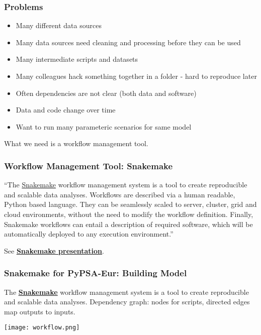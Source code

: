 \documentclass[10pt,aspectratio=169,dvipsnames]{beamer}
\let\olditem\item
\renewcommand{\item}{%
\olditem\vspace{5pt}}
\begin{document}
\begin{frame}
  \frametitle{Problems}

  \begin{itemize}
  \item Many different data sources
  \item Many data sources need cleaning and processing before they can be used
  \item Many intermediate scripts and datasets
  \item Many colleagues hack something together in a folder - hard to reproduce later
  \item Often dependencies are not clear (both data and software)
  \item Data and code change over time
  \item Want to run many parameteric scenarios for same model
  \end{itemize}

  \vspace{.5cm}
  \pause
  What we need is a \alert{workflow management tool}.

\end{frame}

\begin{frame}
  \frametitle{Workflow Management Tool: Snakemake}

  ``The \href{https://snakemake.readthedocs.io/en/stable/}{Snakemake} workflow management system is a tool to create \alert{reproducible and scalable data analyses}. Workflows are described via a human readable, Python based language. They can be seamlessly scaled to server, cluster, grid and cloud environments, without the need to modify the workflow definition. Finally, Snakemake workflows can entail a description of required software, which will be automatically deployed to any execution environment.''

 \vspace{1cm}

  See \href{https://slides.com/johanneskoester/snakemake-short}{\bf\color{blue}\underline{Snakemake presentation}}.

\end{frame}


\begin{frame}
  \frametitle{Snakemake for PyPSA-Eur: Building Model}

    The \href{https://snakemake.readthedocs.io/en/stable/}{\bf\color{blue}\underline{Snakemake}} workflow management system is a tool to create \alert{reproducible and scalable data analyses}. Dependency graph: \alert{nodes} for scripts, \alert{directed edges} map outputs to inputs.


    \vspace{.3cm}

  \texttt{[image: workflow.png]}
\end{frame}
\end{document}
